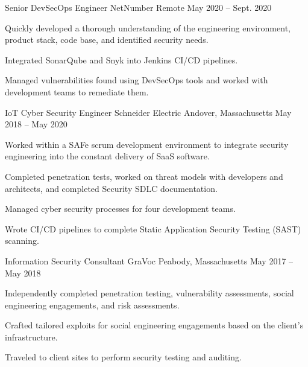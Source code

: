 \begin{cventries}
  \cventry
    {Senior DevSecOps Engineer} %
    {NetNumber} %
    {Remote} %
    {May 2020 – Sept. 2020} %
    {
      \begin{cvitems} %
        \item {
          Quickly developed a thorough understanding of the engineering environment, product stack, code base, and identified security needs.
        }
        \item {
          Integrated SonarQube and Snyk into Jenkins CI/CD pipelines.
        }
        \item {
          Managed vulnerabilities found using DevSecOps tools and worked with development teams to remediate them.
        }
      \end{cvitems}
    }

  \cventry
    {IoT Cyber Security Engineer} %
    {Schneider Electric} %
    {Andover, Massachusetts} %
    {May 2018 – May 2020} %
    {
      \begin{cvitems} %
        \item {
          Worked within a SAFe scrum development environment to integrate security engineering into the constant delivery of SaaS software.
        }
        \item {
          Completed penetration tests, worked on threat models with developers and architects, and completed Security SDLC documentation.
        }
        \item {
          Managed cyber security processes for four development teams.
        }
        \item {
          Wrote CI/CD pipelines to complete Static Application Security Testing (SAST) scanning.
        }
      \end{cvitems}
    }

  \cventry
    {Information Security Consultant} %
    {GraVoc} %
    {Peabody, Massachusetts} %
    {May 2017 – May 2018} %
    {
      \begin{cvitems} %
        \item {
          Independently completed penetration testing, vulnerability assessments, social engineering engagements, and risk assessments.
        }
        \item {
          Crafted tailored exploits for social engineering engagements based on the client's infrastructure.
        }
        \item {
          Traveled to client sites to perform security testing and auditing.
        }
      \end{cvitems}
    }
\end{cventries}
